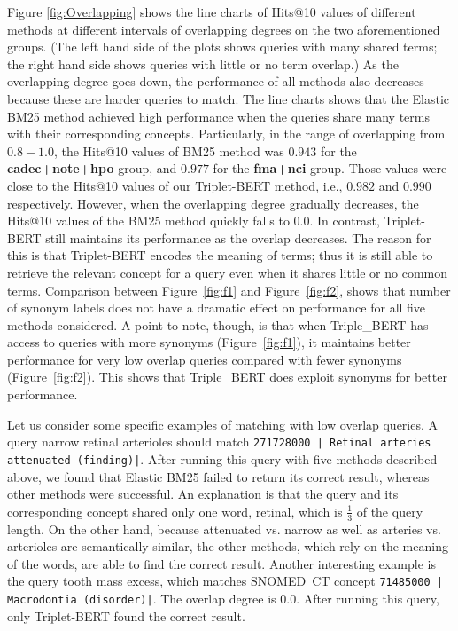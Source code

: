 \documentclass[preprint,12pt]{elsarticle}
\begin{document}
Figure \ref{fig:Overlapping} shows the line charts of Hits@10 values of different methods at different intervals of overlapping degrees on the two aforementioned groups. (The left hand side of the plots shows queries with many shared terms; the right hand side shows queries with little or no term overlap.) As the overlapping degree goes down, the performance of all methods also decreases because these are harder queries to match. The line charts shows that the Elastic BM25 method achieved high performance when the queries share many terms with their corresponding concepts. Particularly, in the range of overlapping from $0.8-1.0$, the Hits@10 values of BM25 method was $0.943$ for the \textbf{cadec+note+hpo} group, and $0.977$ for the \textbf{fma+nci} group. Those values were close to the Hits@10 values of our Triplet-BERT method, i.e., $0.982$ and $0.990$ respectively. However, when the overlapping degree gradually decreases, the Hits@10 values of the BM25 method quickly falls to $0.0$. In contrast, Triplet-BERT still maintains its performance as the overlap decreases. The reason for this is that Triplet-BERT encodes the meaning of terms; thus it is still able to retrieve the relevant concept for a query even when it shares little or no common terms. Comparison between Figure~\ref{fig:f1} and Figure~\ref{fig:f2}, shows that number of synonym labels does not have a dramatic effect on performance for all five methods considered. A point to note, though, is that when Triple\_BERT has access to queries with more synonyms (Figure~\ref{fig:f1}), it maintains better performance for very low overlap queries compared with fewer synonyms (Figure~\ref{fig:f2}). This shows that Triple\_BERT does exploit synonyms for better performance.

Let us consider some specific examples of matching with low overlap queries. A query {narrow retinal arterioles} should match \texttt{271728000 | Retinal arteries attenuated (finding)|}. After running this query with five methods described above, we found that Elastic BM25 failed to return its correct result, whereas other methods were successful. An explanation is that the query and its corresponding concept shared only one word, {retinal}, which is $\frac{1}{3}$ of the query length. On the other hand, because {attenuated} vs. {narrow} as well as {arteries} vs. {arterioles} are semantically similar, the other methods, which rely on the meaning of the words, are able to find the correct result. Another interesting example is the query {tooth mass excess}, which matches SNOMED~CT concept \texttt{71485000 | Macrodontia (disorder)|}. The overlap degree is $0.0$. After running this query, only Triplet-BERT found the correct result.
\end{document}

